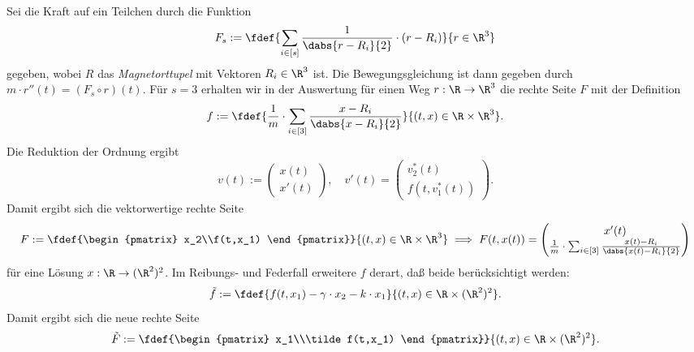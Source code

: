 \documentclass[
    oneside,
    ngerman,
    footinclude=false,
    captions=tableheading,
    DIV=12
]{scrartcl}
\begin{document}
\aufgabe{}
\subaufgabe{}
    Sei die Kraft auf ein Teilchen durch die Funktion
    \[F_s:=\fdef{\sum_{i\in[s]}\frac{1}{\dabs{r - R_i}{2}}\cdot (r-R_i)}{r\in\R^3}\]
    gegeben, wobei $R$ das \emph{Magnetorttupel} mit Vektoren $R_i\in\R^3$ ist. Die Bewegungsgleichung ist dann gegeben durch $m\cdot r''(t) = (F_s\circ r)(t)$. Für $s = 3$ erhalten wir in der Auswertung für einen Weg $r:\R\to\R^3$ die rechte Seite $F$ mit der Definition
    \[f:=\fdef{\frac{1}{m}\cdot\sum_{i\in[3]}\frac{x-R_i}{\dabs{x-R_i}{2}}}{(t,x)\in\R\times\R^3}.\]
    Die Reduktion der Ordnung ergibt
    \[v(t):=\begin{pmatrix}
        x(t)\\x'(t)
    \end{pmatrix},\quad v'(t)=\begin{pmatrix}
        v_2^*(t)\\f(t,v_1^*(t))
    \end{pmatrix}.\]
    Damit ergibt sich die vektorwertige rechte Seite
    \[F:=\fdef{\begin{pmatrix}
        x_2\\f(t,x_1)
    \end{pmatrix}}{(t,x)\in\R\times\R^3}\implies F(t,x(t)) = \begin{pmatrix}
        x'(t)\\\frac{1}{m}\cdot\sum_{i\in[3]}\frac{x(t)-R_i}{\dabs{x(t)-R_i}{2}}
    \end{pmatrix}\]
    für eine Lösung $x:\R\to(\R^2)^2$. Im Reibungs- und Federfall erweitere $f$ derart, daß beide berücksichtigt werden:
    \[\tilde f:=\fdef{f(t,x_1) - \gamma\cdot x_2 - k\cdot x_1}{(t,x)\in\R\times(\R^2)^2}.\]
    Damit ergibt sich die neue rechte Seite
    \[\tilde F:=\fdef{\begin{pmatrix}
        x_1\\\tilde f(t,x_1)
    \end{pmatrix}}{(t,x)\in\R\times(\R^2)^2}.\]
\end{document}

